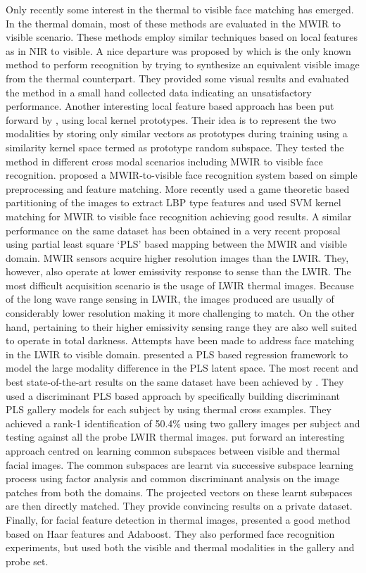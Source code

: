\documentclass[smallextended,natbib]{svjour3}       \usepackage{graphicx}
\begin{document}
Only recently some interest in the thermal to visible face matching has emerged. In the thermal domain, most of these methods are evaluated in the MWIR to visible scenario.  These methods employ similar techniques based on local features as in NIR to visible. A nice departure was proposed by \cite{li2008} which is the only known method to perform recognition by trying to synthesize an equivalent visible image from the thermal counterpart. They provided some visual results and evaluated the method in a small hand collected data indicating an unsatisfactory performance. Another interesting local feature based approach has been put forward by \cite{Klare13}, using local kernel prototypes. Their idea is to represent the two modalities by storing only similar vectors as prototypes during training using a similarity kernel space termed as prototype random subspace. They tested the method in different cross modal scenarios including MWIR to visible face recognition. \cite{bourlai2012} proposed a MWIR-to-visible face recognition system based on simple preprocessing and feature matching. More recently \cite{hu2014} used a game theoretic based partitioning of the images to extract LBP type features and used SVM kernel matching for MWIR to visible face recognition achieving good results. A similar performance on the same dataset has been obtained in a very recent proposal \cite{hu2015} using partial least square `PLS' based mapping between the MWIR and visible domain. MWIR sensors acquire higher resolution images than the LWIR. They, however, also operate at lower emissivity response to sense than the LWIR. The most difficult acquisition scenario is the usage of LWIR thermal images. Because of the long wave range sensing in LWIR, the images produced are usually of considerably lower resolution making it more challenging to match. On the other hand, pertaining to their higher emissivity sensing range they are also well suited to operate in total darkness. Attempts have been made to address face matching in the LWIR to visible domain. \cite{choi2012} presented a PLS based regression framework to model the large modality difference in the PLS latent space. The most recent and best state-of-the-art results on the same dataset have been achieved by \cite{hu2015}. They used a discriminant PLS based approach by specifically building discriminant PLS gallery models for each subject by using thermal cross examples. They achieved a rank-1 identification of 50.4\% using two gallery images per subject and testing against all the probe LWIR thermal images. \cite{Chen2015} put forward an interesting approach centred on learning common subspaces between visible and thermal facial images. The common subspaces are learnt via successive subspace learning process using factor analysis and common discriminant analysis on the image patches from both the domains. The projected vectors on these learnt subspaces are then directly matched. They provide convincing results on a private dataset. Finally, for facial feature detection in thermal images,\cite{mostafa2013} presented a good method based on Haar features and Adaboost. They also performed  face recognition experiments, but used both the visible and thermal modalities in the gallery and probe set.
\end{document}
